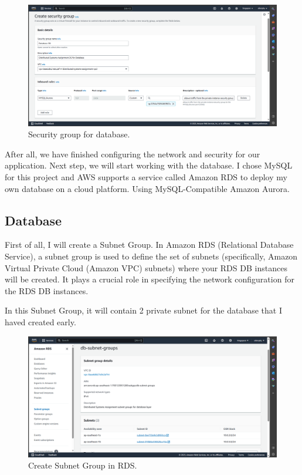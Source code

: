 \documentclass{article}
\begin{document}
\begin{figure}[h]
    \centering
    \includegraphics[width=12cm]{Pictures/Networking and Security/SG_create_5.png}
    \caption{Security group for database.}
    \label{fig:enter-label}
\end{figure}

After all, we have finished configuring the network and security for our application. Next step, we will start working with the database. I chose MySQL for this project and AWS supports a service called Amazon RDS to deploy my own database on a cloud platform. Using MySQL-Compatible Amazon Aurora.
\newpage

\subsection{Database}
First of all, I will create a Subnet Group. In Amazon RDS (Relational Database Service), a subnet group is used to define the set of subnets (specifically, Amazon Virtual Private Cloud (Amazon VPC) subnets) where your RDS DB instances will be created. It plays a crucial role in specifying the network configuration for the RDS DB instances.\par
In this Subnet Group, it will contain 2 private subnet for the database that I haved created early.\par
\begin{figure}[h]
    \centering
    \includegraphics[width=12cm]{Pictures/Database/Subnet_group_create_1.png}
    \caption{Create Subnet Group in RDS.}
    \label{fig:enter-label}
\end{figure}
\end{document}
